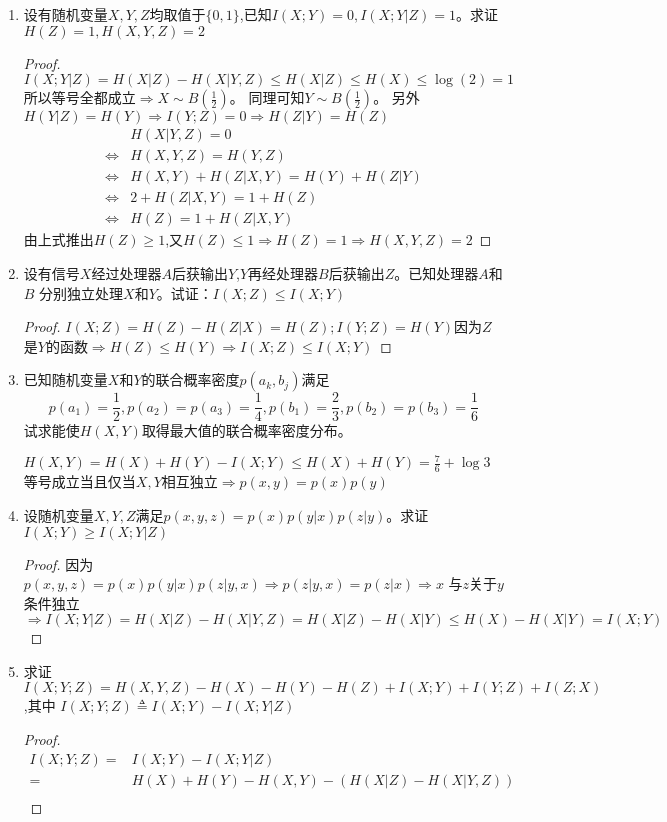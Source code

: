 \documentclass[a4paper]{article}
\begin{document}
\begin{enumerate}[label=\thehwcnt.\arabic*.]
\begin{solution}
\end{solution}
\item 设有随机变量$X,Y,Z$均取值于$\{0,1\}$,已知$I(X;Y)=0,I(X;Y|Z)=1$。求证$H(Z)=1,H(X,Y,Z)=2$
\begin{proof}
$I(X;Y|Z)=H(X|Z)-H(X|Y,Z)\leq H(X|Z)\leq H(X)\leq \log(2)=1$
所以等号全都成立$\Rightarrow X\sim B(\frac{1}{2})$。
同理可知$Y\sim B(\frac{1}{2})$。
另外$H(Y|Z)=H(Y)\Rightarrow I(Y;Z)=0\Rightarrow H(Z|Y)=H(Z)$
\begin{align*}
&H(X|Y,Z)=0 \\
\iff &H(X,Y,Z)=H(Y,Z)\\
\iff &H(X,Y)+H(Z|X,Y)=H(Y)+H(Z|Y)\\
\iff &2+H(Z|X,Y)=1+H(Z)\\
\iff &H(Z)=1+H(Z|X,Y)
\end{align*}
由上式推出$H(Z)\geq 1$,又$H(Z)\leq 1\Rightarrow H(Z)=1\Rightarrow H(X,Y,Z)=2$
\end{proof}
\item
设有信号$X$经过处理器$A$后获输出$Y$,$Y$再经处理器$B$后获输出$Z$。已知处理器$A$和$B$
分别独立处理$X$和$Y$。试证：$I(X;Z)\leq I(X;Y)$
\begin{proof}
$I(X;Z)=H(Z)-H(Z|X)=H(Z);I(Y;Z)=H(Y)$因为$Z$是$Y$的函数$\Rightarrow H(Z)\leq H(Y) \Rightarrow I(X;Z)\leq I(X;Y)$
\end{proof}
\item 已知随机变量$X$和$Y$的联合概率密度$p(a_k,b_j)$满足
$$
p(a_1)=\frac{1}{2},p(a_2)=p(a_3)=\frac{1}{4},p(b_1)=\frac{2}{3},p(b_2)=p(b_3)=\frac{1}{6}
$$
试求能使$H(X,Y)$取得最大值的联合概率密度分布。
\begin{solution}
$H(X,Y)=H(X)+H(Y)-I(X;Y)\leq H(X)+H(Y)=\frac{7}{6}+\log 3$
等号成立当且仅当$X,Y$相互独立$\Rightarrow p(x,y)=p(x)p(y)$
\end{solution}
\item 设随机变量$X,Y,Z$满足$p(x,y,z)=p(x)p(y|x)p(z|y)$。求证$I(X;Y)\geq I(X;Y|Z)$
\begin{proof}
因为$p(x,y,z)=p(x)p(y|x)p(z|y,x)\Rightarrow p(z|y,x)=p(z|x)\Rightarrow x$ 与$z$关于$y$条件独立$\Rightarrow I(X;Y|Z)=H(X|Z)-H(X|Y,Z)= H(X|Z)-H(X|Y)\leq H(X)-H(X|Y) =I(X;Y)$
\end{proof}
\item 求证$I(X;Y;Z)=H(X,Y,Z)-H(X)-H(Y)-H(Z)+I(X;Y)+I(Y;Z)+I(Z;X)$,其中
$I(X;Y;Z)\triangleq I(X;Y)-I(X;Y|Z)$
\begin{proof}
\begin{align*}
I(X;Y;Z) =& I(X;Y)-I(X;Y|Z) \\
=& H(X)+H(Y)-H(X,Y)-(H(X|Z)-H(X|Y,Z))\\

\end{align*}
\end{proof}
\end{enumerate}
\end{document}
